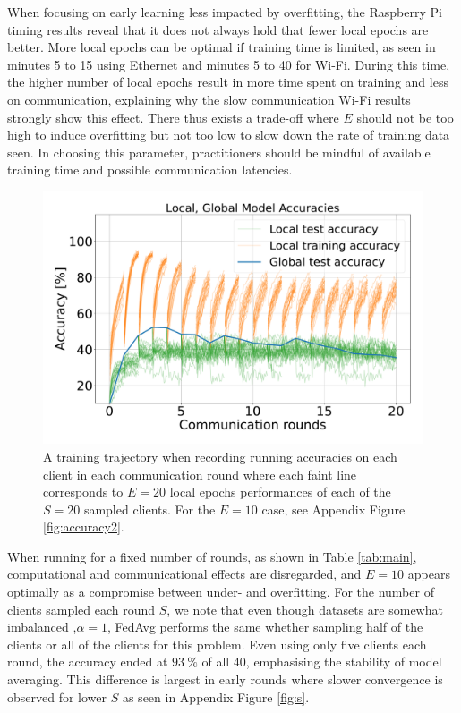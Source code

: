 \documentclass{article}
\newcommand{\unit}[1]{\ensuremath{\:\text{#1}}}
\newcommand{\pro}{\ensuremath{\unit{\%{}}}}
\begin{document}
When focusing on early learning less impacted by overfitting, the Raspberry Pi timing results reveal that it does not always hold that fewer local epochs are better.
More local epochs can be optimal if training time is limited, as seen in minutes 5 to 15 using Ethernet and minutes 5 to 40 for Wi-Fi.
During this time, the higher number of local epochs result in more time spent on training and less on communication, explaining why the slow communication Wi-Fi results strongly show this effect.
There thus exists a trade-off where $E$ should not be too high to induce overfitting but not too low to slow down the rate of training data seen.
In choosing this parameter, practitioners should be mindful of available training time and possible communication latencies.
\begin{figure}[htb!]
    \centering
        \includegraphics[width=\linewidth]{imgs/accuracy.pdf}
    \caption{
        A training trajectory when recording running accuracies on each client in each communication round where each faint line corresponds to $E=20$ local epochs performances of each of the $S=20$ sampled clients.
        For the $E=10$ case, see Appendix Figure \ref{fig:accuracy2}.
    }
    \label{fig:accuracy}
\end{figure}\noindent

\noindent
When running for a fixed number of rounds, as shown in Table \ref{tab:main}, computational and communicational effects are disregarded, and $E=10$ appears optimally as a compromise between under- and overfitting.
For the number of clients sampled each round $S$, we note that even though datasets are somewhat imbalanced ,$\alpha=1$, FedAvg performs the same whether sampling half of the clients or all of the clients for this problem.
Even using only five clients each round, the accuracy ended at $93 \pro$ of all 40, emphasising the stability of model averaging.
This difference is largest in early rounds where slower convergence is observed for lower $S$ as seen in Appendix Figure \ref{fig:s}.
\end{document}
